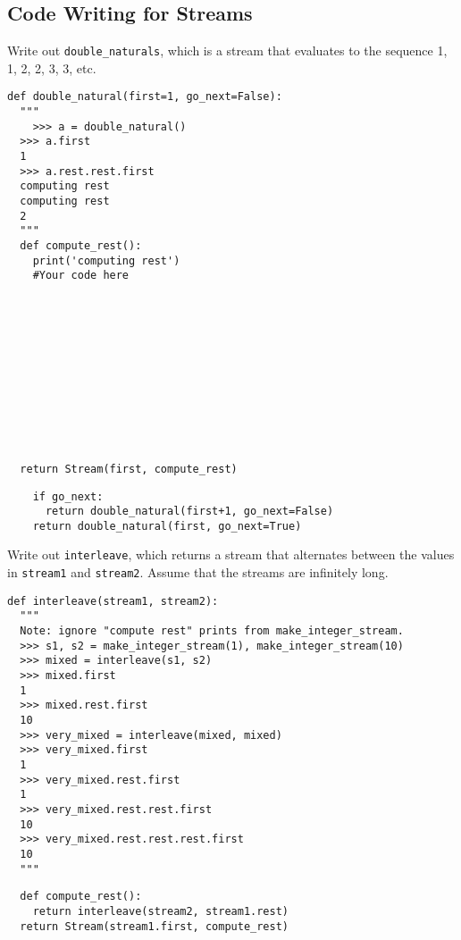 \documentclass{exam}
\begin{document}
\subsection{Code Writing for Streams}

\begin{questions}
\question Write out \texttt{double\_naturals}, which is a stream that evaluates to the sequence 1, 1, 2, 2, 3, 3, etc.
\begin{lstlisting}
def double_natural(first=1, go_next=False):
  """
    >>> a = double_natural()
  >>> a.first
  1
  >>> a.rest.rest.first
  computing rest
  computing rest
  2
  """
  def compute_rest():
    print('computing rest')
    #Your code here












  return Stream(first, compute_rest)
\end{lstlisting}

\begin{solution}
\begin{lstlisting}
    if go_next:
      return double_natural(first+1, go_next=False)
    return double_natural(first, go_next=True)
\end{lstlisting}
\end{solution}

\clearpage

\question Write out \texttt{interleave}, which returns a stream that alternates between the values in \texttt{stream1} and \texttt{stream2}. Assume that the streams are infinitely long.
\begin{lstlisting}
def interleave(stream1, stream2):
  """
  Note: ignore "compute rest" prints from make_integer_stream.
  >>> s1, s2 = make_integer_stream(1), make_integer_stream(10)
  >>> mixed = interleave(s1, s2)
  >>> mixed.first
  1
  >>> mixed.rest.first
  10
  >>> very_mixed = interleave(mixed, mixed)
  >>> very_mixed.first
  1
  >>> very_mixed.rest.first
  1
  >>> very_mixed.rest.rest.first
  10
  >>> very_mixed.rest.rest.rest.first
  10
  """

\end{lstlisting}

\begin{solution}
\begin{lstlisting}
  def compute_rest():
    return interleave(stream2, stream1.rest)
  return Stream(stream1.first, compute_rest)
\end{lstlisting}
\end{solution}
\end{questions}


\end{document}
